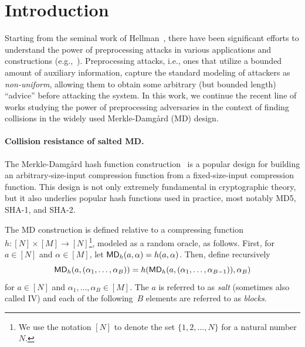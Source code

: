 
\section{Introduction}

Starting from the seminal work of Hellman~\cite{Hellman80}, there have been significant efforts to understand the power of preprocessing attacks in various applications and constructions (e.g.,~\cite{Yao90,FiatN99,Oechslin03,BarkanBS06,Unruh07,DeTT10,DodisGK17,AbusalahACKPR17,CorettiDGS18,CorettiDG18,AkshimaCDW20,Corrigan-GibbsK19,ChawinHM20}). 
Preprocessing attacks, i.e., ones that utilize a bounded amount of auxiliary
information, capture the standard modeling of attackers as \emph{non-uniform}, allowing them to obtain some arbitrary (but bounded length) ``advice'' before attacking the system. 
In this work, we continue the recent line of works studying the power of preprocessing adversaries in the context of finding collisions in the widely used Merkle-Damg{\aa}rd (MD) design. 

\paragraph{Collision resistance of salted MD.}
The Merkle-Damg{\aa}rd  hash function construction~\cite{Merklephdthesis,Merkle87,Merkle89,Damgard87} is a popular design for building an arbitrary-size-input compression function from a fixed-size-input compression function. This design is not only extremely fundamental in cryptographic theory, but it also underlies popular hash functions used in practice, most notably MD5, SHA-1, and SHA-2. 

The MD construction is defined relative to a  compressing function $h\colon [N]\times  [M] \to [N]$\footnote{We use the notation $[N]$ to denote the set $\{1,2,\ldots,N\}$ for a natural number $N$.}, modeled as a random oracle, as follows. First, for $a\in [N]$ and $\alpha\in[M]$, let
$\mathsf{MD}_h(a,\alpha)=h(a,\alpha)$. Then, define recursively \[\mathsf{MD}_h(a,(\alpha_1,\ldots,\alpha_B))=h(\mathsf{MD}_h(a,(\alpha_1,\ldots,\alpha_{B-1})),\alpha_B)\] for $a\in [N]$ and $\alpha_1,\ldots,\alpha_B\in [M]$. The $a$ is referred to as \emph{salt} (sometimes also called IV) and each of the following~$B$ elements are referred to as \emph{blocks}. 

